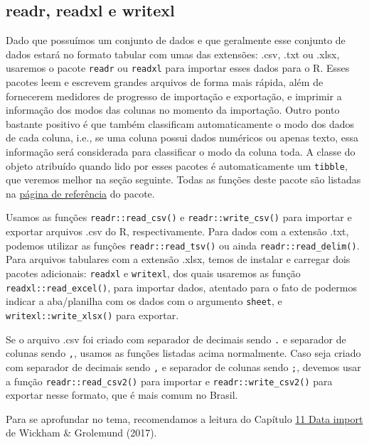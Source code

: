 \documentclass[
]{article}
\begin{document}
\hypertarget{readr-readxl-e-writexl}{%
\subsection{readr, readxl e writexl}\label{readr-readxl-e-writexl}}

Dado que possuímos um conjunto de dados e que geralmente esse conjunto de dados estará no formato tabular com umas das extensões: .csv, .txt ou .xlsx, usaremos o pacote \texttt{readr} ou \texttt{readxl} para importar esses dados para o R. Esses pacotes leem e escrevem grandes arquivos de forma mais rápida, além de fornecerem medidores de progresso de importação e exportação, e imprimir a informação dos modos das colunas no momento da importação. Outro ponto bastante positivo é que também classificam automaticamente o modo dos dados de cada coluna, i.e., se uma coluna possui dados numéricos ou apenas texto, essa informação será considerada para classificar o modo da coluna toda. A classe do objeto atribuído quando lido por esses pacotes é automaticamente um \texttt{tibble}, que veremos melhor na seção seguinte. Todas as funções deste pacote são listadas na \href{https://readr.tidyverse.org/reference/index.html}{página de referência} do pacote.

Usamos as funções \texttt{readr::read\_csv()} e \texttt{readr::write\_csv()} para importar e exportar arquivos .csv do R, respectivamente. Para dados com a extensão .txt, podemos utilizar as funções \texttt{readr::read\_tsv()} ou ainda \texttt{readr::read\_delim()}. Para arquivos tabulares com a extensão .xlsx, temos de instalar e carregar dois pacotes adicionais: \texttt{readxl} e \texttt{writexl}, dos quais usaremos as função \texttt{readxl::read\_excel()}, para importar dados, atentado para o fato de podermos indicar a aba/planilha com os dados com o argumento \texttt{sheet}, e \texttt{writexl::write\_xlsx()} para exportar.

Se o arquivo .csv foi criado com separador de decimais sendo \texttt{.} e separador de colunas sendo \texttt{,}, usamos as funções listadas acima normalmente. Caso seja criado com separador de decimais sendo \texttt{,} e separador de colunas sendo \texttt{;}, devemos usar a função \texttt{readr::read\_csv2()} para importar e \texttt{readr::write\_csv2()} para exportar nesse formato, que é mais comum no Brasil.

Para se aprofundar no tema, recomendamos a leitura do Capítulo \href{https://r4ds.had.co.nz/data-import.html}{11 Data import} de Wickham \& Grolemund (2017).
\end{document}
